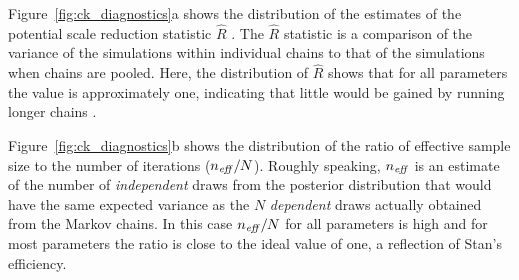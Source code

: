 Figure~{\ref{fig:ck_diagnostics}a} shows the distribution of the estimates of the potential scale reduction statistic $\hat{R}$  . The $\hat{R}$ statistic is a comparison of the variance of the simulations within individual chains to that of the simulations when chains are pooled. Here, the distribution of $\hat{R}$ shows that for all parameters the value is approximately one, indicating that little would be gained by running longer chains . 

Figure~{\ref{fig:ck_diagnostics}b} shows the distribution of the ratio of effective sample size to the number of iterations ($n_{\it eff}/N$). Roughly speaking, $n_{\it eff}$ is an estimate of the number of {\it independent} draws from the posterior distribution that would have the same expected variance as the $N$ {\it dependent} draws actually obtained from the Markov chains. In this case $n_{\it eff}/N$ for all parameters is high and for most parameters the ratio is close to the ideal value of one, a reflection of Stan's efficiency. 


